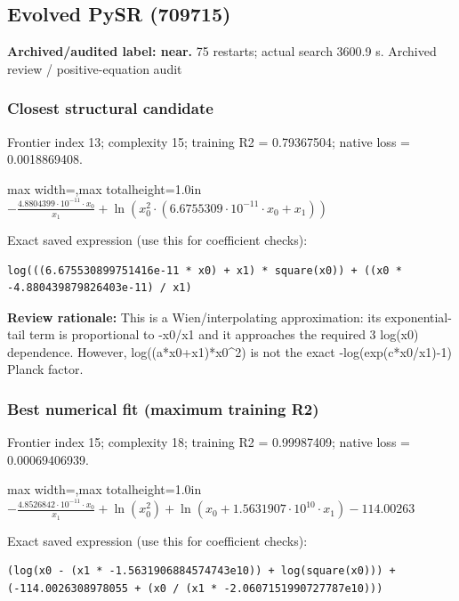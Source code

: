 \documentclass[10pt,letterpaper,landscape]{article}
\begin{document}
\begin{minipage}[t]{0.485\textwidth}
\subsection*{Evolved PySR (709715)}
\textbf{Archived/audited label: near.} 75 restarts; actual search 3600.9 s.
{\small Archived review / positive-equation audit}
\subsubsection*{Closest structural candidate}
Frontier index 13; complexity 15; training R2 = 0.79367504; native loss = 0.0018869408.
\begin{center}\begin{adjustbox}{max width=\linewidth,max totalheight=1.0in}$\displaystyle - \frac{4.8804399 \cdot 10^{-11} \cdot x_{0}}{x_{1}} + \ln{\left(x_{0}^{2} \cdot \left(6.6755309 \cdot 10^{-11} \cdot x_{0} + x_{1}\right) \right)}$\end{adjustbox}\end{center}
{\scriptsize Exact saved expression (use this for coefficient checks):}
\begin{lstlisting}
log(((6.675530899751416e-11 * x0) + x1) * square(x0)) + ((x0 * -4.880439879826403e-11) / x1)
\end{lstlisting}
{\small\textbf{Review rationale:} This is a Wien/interpolating approximation: its exponential-tail term is proportional to -x0/x1 and it approaches the required 3 log(x0) dependence. However, log((a*x0+x1)*x0\textasciicircum{}2) is not the exact -log(exp(c*x0/x1)-1) Planck factor.}
\subsubsection*{Best numerical fit (maximum training R2)}
Frontier index 15; complexity 18; training R2 = 0.99987409; native loss = 0.00069406939.
\begin{center}\begin{adjustbox}{max width=\linewidth,max totalheight=1.0in}$\displaystyle - \frac{4.8526842 \cdot 10^{-11} \cdot x_{0}}{x_{1}} + \ln{\left(x_{0}^{2} \right)} + \ln{\left(x_{0} + 1.5631907 \cdot 10^{10} \cdot x_{1} \right)} - 114.00263$\end{adjustbox}\end{center}
{\scriptsize Exact saved expression (use this for coefficient checks):}
\begin{lstlisting}
(log(x0 - (x1 * -1.5631906884574743e10)) + log(square(x0))) + (-114.0026308978055 + (x0 / (x1 * -2.0607151990727787e10)))
\end{lstlisting}
\end{minipage}
\clearpage{}\label{planck-10006}
\end{document}
